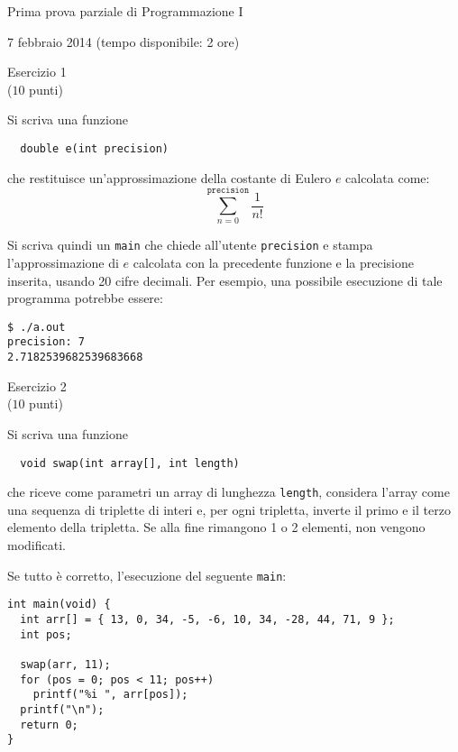 \documentclass[italian,12pt]{article}
\begin{document}
\begin{center}{\LARGE Prima prova parziale di Programmazione I}\\
\begin{center}
  \Large 7 febbraio 2014 (tempo disponibile: 2 ore)
\end{center}
\end{center}
\begin{center}{\Large Esercizio 1}\\
($10$ punti)
\end{center}
Si scriva una funzione
\begin{verbatim}
  double e(int precision)
\end{verbatim}
che restituisce un'approssimazione della costante di Eulero $e$ calcolata come:
\[
  \sum\limits_{n=0}^{\mathtt{precision}}\frac{1}{n!}
\]

\noindent
Si scriva quindi un \texttt{main} che chiede all'utente \texttt{precision} e stampa l'approssimazione
di $e$ calcolata con la precedente funzione e la precisione inserita, usando 20 cifre
decimali. Per esempio, una possibile esecuzione di tale programma potrebbe essere:
%
{\small
\begin{verbatim}
$ ./a.out
precision: 7
2.7182539682539683668
\end{verbatim}
}
%
\begin{center}{\Large Esercizio 2}\\
($10$ punti)
\end{center}
%
Si scriva una funzione
%
\begin{verbatim}
  void swap(int array[], int length)
\end{verbatim}
%
che riceve come parametri un array di lunghezza
\texttt{length}, considera l'array come una sequenza di
triplette di interi e, per ogni tripletta, inverte il primo e il terzo
elemento della tripletta. Se alla fine rimangono 1 o 2 elementi, non vengono
modificati.

Se tutto \`e corretto, l'esecuzione del seguente \texttt{main}:
{\small
\begin{verbatim}
int main(void) {
  int arr[] = { 13, 0, 34, -5, -6, 10, 34, -28, 44, 71, 9 };
  int pos;

  swap(arr, 11);
  for (pos = 0; pos < 11; pos++)
    printf("%i ", arr[pos]);
  printf("\n");
  return 0;
}

\end{verbatim}
}
\end{document}

